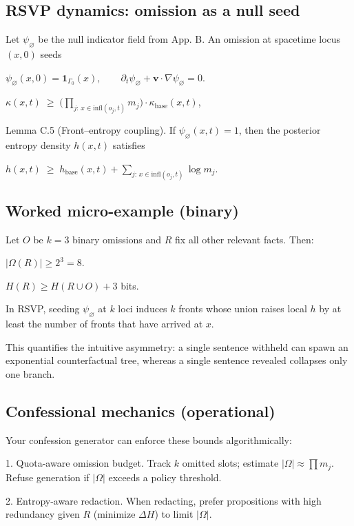 \documentclass{article}
\begin{document}
\subsection{RSVP dynamics: omission as a null seed}

Let $\psi_{\varnothing}$ be the null indicator field from App. B. An omission at spacetime locus $(x,0)$ seeds

$\psi_{\varnothing}(x,0)=\mathbf{1}_{\Gamma_0}(x),\qquad
\partial_t \psi_{\varnothing}+\mathbf v\cdot\nabla \psi_{\varnothing}=0 $.

$\kappa(x,t)\;\ge\;\Bigg(\prod_{j:\,x\in\mathrm{infl}(o_j,t)} m_j\Bigg)\cdot \kappa_{\text{base}}(x,t)$,

Lemma C.5 (Front–entropy coupling).
If $\psi_{\varnothing}(x,t)=1$, then the posterior entropy density $h(x,t)$ satisfies

$h(x,t)\;\ge\; h_{\text{base}}(x,t)+\sum_{j:\,x\in\mathrm{infl}(o_j,t)} \log m_j $.

\subsection{Worked micro-example (binary)}

Let $O$ be $k=3$ binary omissions and $R$ fix all other relevant facts. Then:

$|\Omega(R)|\ge 2^3=8$.

$H(R)\ge H(R\cup O)+3$ bits.

In RSVP, seeding $\psi_{\varnothing}$ at $k$ loci induces $k$ fronts whose union raises local $h$ by at least the number of fronts that have arrived at $x$.

This quantifies the intuitive asymmetry: a single sentence withheld can spawn an exponential counterfactual tree, whereas a single sentence revealed collapses only one branch.

\subsection{Confessional mechanics (operational)}

Your confession generator can enforce these bounds algorithmically:

1. Quota-aware omission budget. Track $k$ omitted slots; estimate $|\Omega|\approx \prod m_j$. Refuse generation if $|\Omega|$ exceeds a policy threshold.

2. Entropy-aware redaction. When redacting, prefer propositions with high redundancy given $R$ (minimize $\Delta H$) to limit $|\Omega|$.
\end{document}

